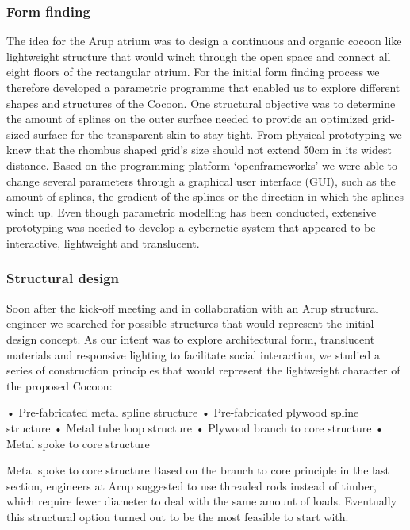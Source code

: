\subsubsection*{Form finding}

The idea for the Arup atrium was to design a continuous and organic cocoon like lightweight structure that would winch through the open space and connect all eight floors of the rectangular atrium.
For the initial form finding process we therefore developed a parametric programme that enabled us to explore different shapes and structures of the Cocoon. One structural objective was to determine the amount of splines on the outer surface needed to provide an optimized grid-sized surface for the transparent skin to stay tight. From physical prototyping we knew that the rhombus shaped grid’s size should not extend 50cm in its widest distance.
Based on the programming platform ‘openframeworks’  we were able to change several parameters through a graphical user interface (GUI), such as the amount of splines, the gradient of the splines or the direction in which the splines winch up. Even though parametric modelling has been conducted, extensive prototyping was needed to develop a cybernetic system that appeared to be interactive, lightweight and translucent.

\subsubsection*{Structural design}

Soon after the kick-off meeting and in collaboration with an Arup structural engineer we searched for possible structures that would represent the initial design concept. As our intent was to explore architectural form, translucent materials and responsive lighting to facilitate social interaction, we studied a series of construction principles that would represent the lightweight character of the proposed Cocoon:

•	Pre-fabricated metal spline structure
•	Pre-fabricated plywood spline structure
•	Metal tube loop structure
•	Plywood branch to core structure
•	Metal spoke to core structure

Metal spoke to core structure  
Based on the branch to core principle in the last section, engineers at Arup suggested to use threaded rods instead of timber, which require fewer diameter to deal with the same amount of loads. Eventually this structural option turned out to be the most feasible to start with. 


